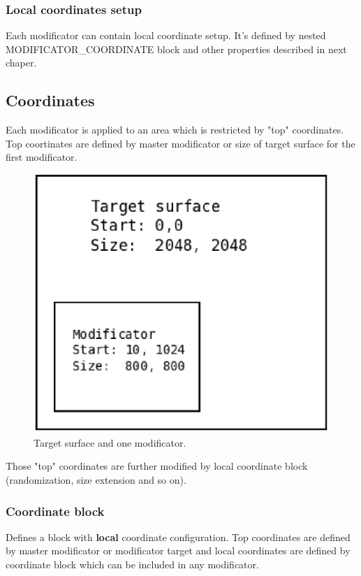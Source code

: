 \documentclass[9pt]{article}
\begin{document}
\subsubsection{Local coordinates setup}

Each modificator can contain local coordinate setup. It's defined by nested 
MODIFICATOR\_COORDINATE block and other properties described in next chaper.

\newpage
\subsection{Coordinates}
Each modificator is applied to an area which is restricted by "top" coordinates. 
Top coortinates are defined by master modificator or size of target surface 
for the first modificator.

\begin{figure}[h]
\begin{center}
  \includegraphics[scale=0.6]{p02.eps}
  \caption{Target surface and one modificator.}
\end{center}
\end{figure}

Those "top" coordinates are further modified by local
coordinate block (randomization, size extension
and so on).

\subsubsection{Coordinate block}
Defines a block with {\bf local} coordinate configuration. 
Top coordinates are defined by master modificator or modificator target and
local coordinates are defined by coordinate block which can be included in
any modificator.
\end{document}
